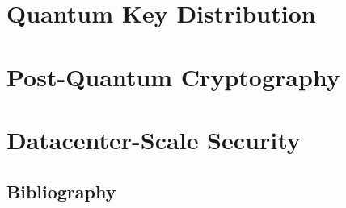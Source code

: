 \documentclass[11pt,twoside,openright]{book}
\begin{document}
\frontmatter
\pagestyle{empty}





\cleardoublepage
{}
\tableofcontents



\mainmatter
\pagestyle{fancy}




\part{Quantum Key Distribution}
\label{part:qkd}




\part{Post-Quantum Cryptography}
\label{part:pqc}




\part{Datacenter-Scale Security}
\label{part:infra}






\backmatter





\chapter{Bibliography}
\label{bibliography}
\sloppy
\printbibliography[notkeyword={my_contribution}, heading=none, resetnumbers=true]
\end{document}

